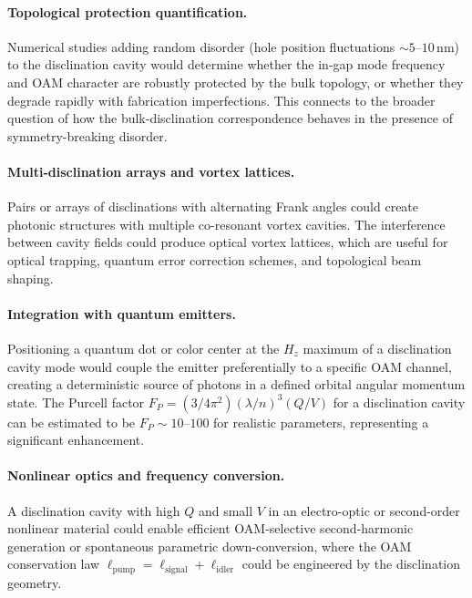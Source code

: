 \documentclass[12pt,a4paper,oneside]{book}
\theoremstyle{plain}
\theoremstyle{definition}
\theoremstyle{remark}
\begin{document}
\paragraph{Topological protection quantification.} Numerical studies adding random disorder (hole position fluctuations $\sim 5$--$10$\,nm) to the disclination cavity would determine whether the in-gap mode frequency and OAM character are robustly protected by the bulk topology, or whether they degrade rapidly with fabrication imperfections. This connects to the broader question of how the bulk-disclination correspondence behaves in the presence of symmetry-breaking disorder.

\paragraph{Multi-disclination arrays and vortex lattices.} Pairs or arrays of disclinations with alternating Frank angles could create photonic structures with multiple co-resonant vortex cavities. The interference between cavity fields could produce optical vortex lattices, which are useful for optical trapping, quantum error correction schemes, and topological beam shaping.

\paragraph{Integration with quantum emitters.} Positioning a quantum dot or color center at the $H_z$ maximum of a disclination cavity mode would couple the emitter preferentially to a specific OAM channel, creating a deterministic source of photons in a defined orbital angular momentum state. The Purcell factor $F_P = (3/4\pi^2)(\lambda/n)^3(Q/V)$ for a disclination cavity can be estimated to be $F_P \sim 10$--$100$ for realistic parameters, representing a significant enhancement.

\paragraph{Nonlinear optics and frequency conversion.} A disclination cavity with high $Q$ and small $V$ in an electro-optic or second-order nonlinear material could enable efficient OAM-selective second-harmonic generation or spontaneous parametric down-conversion, where the OAM conservation law $\ell_\mathrm{pump} = \ell_\mathrm{signal} + \ell_\mathrm{idler}$ could be engineered by the disclination geometry.

\appendix
\end{document}
